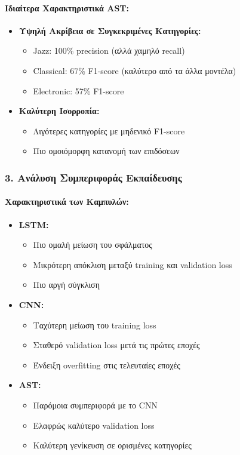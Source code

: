 \documentclass[a4paper,12pt]{article}
\begin{document}
\paragraph{Ιδιαίτερα Χαρακτηριστικά AST:}
\begin{itemize}
    \item \textbf{Υψηλή Ακρίβεια σε Συγκεκριμένες Κατηγορίες:}
    \begin{itemize}
        \item Jazz: 100\% precision (αλλά χαμηλό recall)
        \item Classical: 67\% F1-score (καλύτερο από τα άλλα μοντέλα)
        \item Electronic: 57\% F1-score
    \end{itemize}
    
    \item \textbf{Καλύτερη Ισορροπία:}
    \begin{itemize}
        \item Λιγότερες κατηγορίες με μηδενικό F1-score
        \item Πιο ομοιόμορφη κατανομή των επιδόσεων
    \end{itemize}
\end{itemize}

\subsubsection*{3. Ανάλυση Συμπεριφοράς Εκπαίδευσης}

\paragraph{Χαρακτηριστικά των Καμπυλών:}

\begin{itemize}
    \item \textbf{LSTM:}
    \begin{itemize}
        \item Πιο ομαλή μείωση του σφάλματος
        \item Μικρότερη απόκλιση μεταξύ training και validation loss
        \item Πιο αργή σύγκλιση
    \end{itemize}
    
    \item \textbf{CNN:}
    \begin{itemize}
        \item Ταχύτερη μείωση του training loss
        \item Σταθερό validation loss μετά τις πρώτες εποχές
        \item Ένδειξη overfitting στις τελευταίες εποχές
    \end{itemize}
    
    \item \textbf{AST:}
    \begin{itemize}
        \item Παρόμοια συμπεριφορά με το CNN
        \item Ελαφρώς καλύτερο validation loss
        \item Καλύτερη γενίκευση σε ορισμένες κατηγορίες
    \end{itemize}
\end{itemize}
\end{document}
